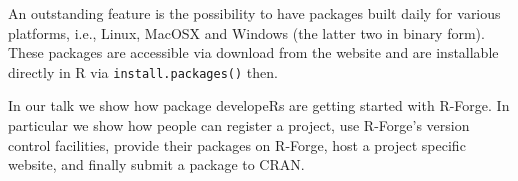 \documentclass[12pt,a4paper]{article}
\let\code=\texttt
\newcommand{\proglang}[1]{\textsf{#1}}
\begin{document}


An outstanding feature is the 
possibility to have packages built daily for  various platforms, i.e.,
Linux, MacOSX and Windows (the latter two in binary form). These
packages are accessible via download from the website and are installable
directly in \proglang{R} via \code{install.packages()} then.

In our talk we show how package developeRs are getting started with
\proglang{R}-Forge. In particular we show how people can register a project, 
use \proglang{R}-Forge's version control facilities, provide their
packages on \proglang{R}-Forge, host a project specific website, and
finally submit a package to CRAN.
\end{document}

